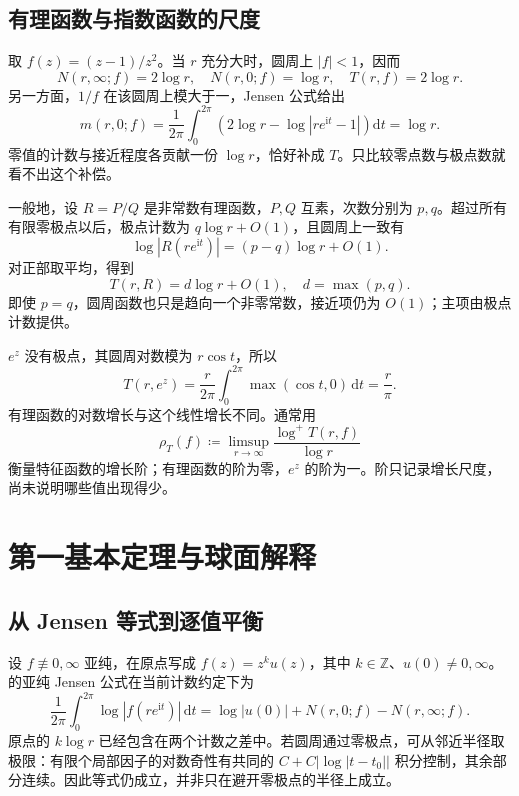\subsection{有理函数与指数函数的尺度}
\label{b3:subsec:C0103}

取 \(f(z)=(z-1)/z^2\)。当 \(r\) 充分大时，圆周上 \(|f|<1\)，因而
\[
 N(r,\infty;f)=2\log r,
 \quad N(r,0;f)=\log r,
 \quad T(r,f)=2\log r.
\]
另一方面，\(1/f\) 在该圆周上模大于一，Jensen 公式给出
\[
 m(r,0;f)=\frac1{2\pi}\int_0^{2\pi}
 \left(2\log r-\log|re^{\mathrm{i}t}-1|\right)\mathrm{d}t
 =\log r.
\]
零值的计数与接近程度各贡献一份 \(\log r\)，恰好补成 \(T\)。只比较零点数与极点数就看不出这个补偿。

\ProseParagraphBreak

一般地，设 \(R=P/Q\) 是非常数有理函数，\(P,Q\) 互素，次数分别为 \(p,q\)。超过所有有限零极点以后，极点计数为 \(q\log r+O(1)\)，且圆周上一致有
\[
 \log|R(re^{\mathrm{i}t})|=(p-q)\log r+O(1).
\]
对正部取平均，得到
\begin{equation}\label{b3:eq:C-rational-growth}
 T(r,R)=d\log r+O(1),\quad d=\max(p,q).
\end{equation}
即使 \(p=q\)，圆周函数也只是趋向一个非零常数，接近项仍为 \(O(1)\)；主项由极点计数提供。

\ProseParagraphBreak

\(e^z\) 没有极点，其圆周对数模为 \(r\cos t\)，所以
\[
 T(r,e^z)=\frac r{2\pi}\int_0^{2\pi}\max(\cos t,0)\,\mathrm{d}t
 =\frac r\pi.
\]
有理函数的对数增长与这个线性增长不同。通常用
\[
 \rho_T(f)\coloneqq\limsup_{r\to\infty}
                  \frac{\log^+T(r,f)}{\log r}
\]
衡量特征函数的增长阶；有理函数的阶为零，\(e^z\) 的阶为一。阶只记录增长尺度，尚未说明哪些值出现得少。

\section{第一基本定理与球面解释}
\label{b3:sec:C02}

\subsection{从 Jensen 等式到逐值平衡}
\label{b3:subsec:C0201}

设 \(f\not\equiv0,\infty\) 亚纯，在原点写成
\(f(z)=z^k u(z)\)，其中 \(k\in\mathbb Z\)、\(u(0)\ne0,\infty\)。的亚纯 Jensen 公式在当前计数约定下为
\begin{equation}\label{b3:eq:C-jensen-balance}
 \frac1{2\pi}\int_0^{2\pi}\log|f(re^{\mathrm{i}t})|\,\mathrm{d}t
 =\log|u(0)|+N(r,0;f)-N(r,\infty;f).
\end{equation}
原点的 \(k\log r\) 已经包含在两个计数之差中。若圆周通过零极点，可从邻近半径取极限：有限个局部因子的对数奇性有共同的 \(C+C|\log|t-t_0||\) 积分控制，其余部分连续。因此等式仍成立，并非只在避开零极点的半径上成立。


